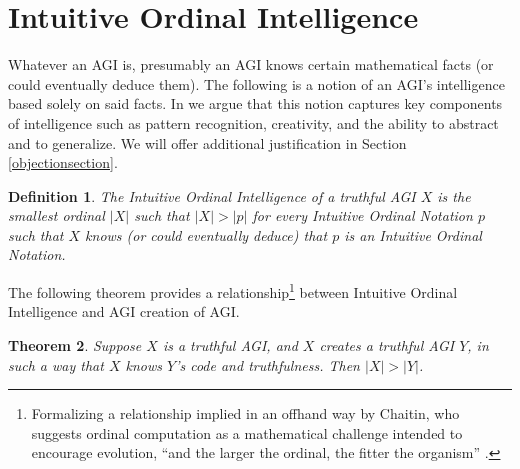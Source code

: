 \documentclass[runningheads]{llncs}
\newtheorem{mytheorem}{Theorem}
\newtheorem{mydefinition}[mytheorem]{Definition}
\begin{document}
\section{Intuitive Ordinal Intelligence}
\label{informalargumentsection}

Whatever an AGI is, presumably an AGI knows certain mathematical facts
(or could eventually deduce them).
The following is a notion of an AGI's intelligence based
solely on said facts. In \cite{alexander2019measuring}
we argue that this notion captures key components of intelligence such as
pattern recognition, creativity, and the ability to abstract and to
generalize. We will offer additional justification in
Section \ref{objectionsection}.

\begin{mydefinition}
\label{maindefinition}
    The \emph{Intuitive Ordinal Intelligence} of a truthful AGI $X$ is the smallest
    ordinal $|X|$ such that $|X|>|p|$ for every Intuitive Ordinal Notation
    $p$ such that $X$ knows (or could eventually deduce) that $p$ is an
    Intuitive Ordinal Notation.
\end{mydefinition}

The following theorem provides a relationship\footnote{Formalizing a relationship implied
in an offhand way by Chaitin, who suggests ordinal computation as a mathematical challenge
intended to encourage evolution, ``and the larger the ordinal,
the fitter the organism'' \cite{chaitin}.} between Intuitive Ordinal Intelligence
and AGI creation of AGI.

\begin{mytheorem}
\label{maintheorem}
    Suppose $X$ is a truthful AGI, and $X$ creates a truthful AGI $Y$,
    in such a way that $X$ knows $Y$'s code and truthfulness. Then
    $|X|>|Y|$.
\end{mytheorem}
\end{document}
